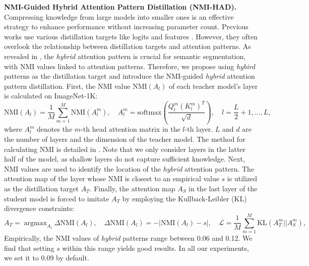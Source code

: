 \textbf{NMI-Guided Hybrid Attention Pattern Distillation (NMI-HAD).} Compressing knowledge from large models into smaller ones is an effective strategy to enhance performance without increasing parameter count. Previous works use various distillation targets like logits \citep{dino} and features \citep{efficient_sam}. However, they often overlook the relationship between distillation targets and attention patterns. As revealed in , the \textit{hybrid} attention pattern is crucial for semantic segmentation, with NMI values linked to attention patterns. Therefore, we propose using \textit{hybird} patterns as the distillation target and introduce the NMI-guided \textit{hybrid} attention pattern distillation. First, the NMI value $\text{NMI}(A_l)$ of each teacher model's layer is calculated on ImageNet-1K:
\begin{equation}
    \text{NMI}(A_l)=\frac{1}{M}\sum_{m=1}^M\text{NMI}(A_l^m),  \quad A_l^m=\text{softmax}\left(\frac{Q_l^m (K_l^m)^T}{\sqrt{d}}\right), \quad l=\frac{L}{2}+1,...,L,
    \label{eq:nmi_cal}
\end{equation}
where $A_l^m$ denotes the $m$-th head attention matrix in the $l$-th layer. $L$ and $d$ are the number of layers and the dimension of the teacher model. The method for calculating NMI is detailed in . Note that we only consider layers in the latter half of the model, as shallow layers do not capture sufficient knowledge. Next, NMI values are used to identify the location of the \textit{hybrid} attention pattern. The attention map of the layer whose NMI is closest to an empirical value $s$ is utilized as the distillation target $A_T$. Finally, the attention map $A_S$ in the last layer of the student model is forced to imitate $A_T$ by employing the Kullback-Leibler (KL) divergence constraints:
\begin{equation}
    A_T = \mathop{\arg\max}_{A_l}\Delta \text{NMI}(A_l), \quad \Delta \text{NMI}(A_l) =-\left\vert \text{NMI}(A_l)-s \right\vert, \quad
    \mathcal{L}=\frac{1}{M}\sum_{m=1}^M \text{KL}(A_{T}^m||A_{S}^m), 
    \label{eq:distill}
\end{equation}
Empirically, the NMI values of \textit{hybrid} patterns range between 0.06 and 0.12. We find that setting $s$ within this range yields good results. In all our experiments, we set it to 0.09 by default.



